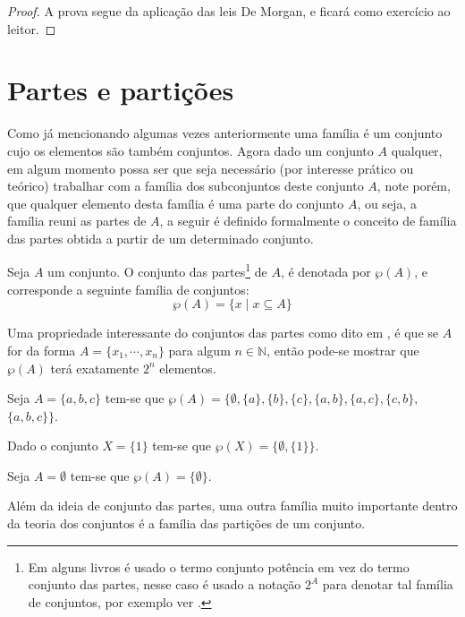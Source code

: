 \begin{proof}
	A prova segue da aplicação das leis De Morgan, e ficará como exercício ao leitor.
\end{proof}

\section{Partes e partições}

Como já mencionando algumas vezes anteriormente uma família é um conjunto cujo os elementos são também conjuntos. Agora dado um conjunto $A$ qualquer, em algum momento possa ser que seja necessário (por interesse prático ou teórico) trabalhar com a família dos subconjuntos deste conjunto $A$, note porém, que qualquer elemento desta família é uma parte do conjunto $A$, ou seja, a família reuni as partes de $A$, a seguir é definido formalmente o conceito de família das partes obtida a partir de um determinado conjunto.

\begin{definition}\label{def:ConjuntoDasPartes}
	Seja $A$ um conjunto. O conjunto das partes\footnote{Em alguns livros é usado o termo conjunto potência em vez do termo conjunto das partes, nesse caso é usado a notação $2^A$ para denotar tal família de conjuntos, por exemplo ver \cite{lipschutz2013-MD}.} de $A$, é denotada por $\wp(A)$, e corresponde a seguinte família de conjuntos:
	$$\wp(A) = \{x \mid x \subseteq A\}$$
\end{definition}


Uma propriedade interessante do conjuntos das partes como dito em \cite{lipschutz1978-TC}, é que se $A$ for da forma $A = \{x_1, \cdots, x_n\}$ para algum $n \in \mathbb{N}$, então pode-se mostrar que $\wp(A)$ terá exatamente $2^n$ elementos.

\begin{exem}
	Seja $A = \{a, b, c\}$ tem-se que $\wp(A) = \{\emptyset, \{a\}, \{b\}, \{c\}, \{a, b\},\{a, c\}, \{c, b\},$ $\{a, b, c\}\}$.
\end{exem}

\begin{exem}
	Dado o conjunto $X = \{1\}$ tem-se que $\wp(X) = \{\emptyset, \{1\}\}$.
\end{exem}

\begin{exem}
	Seja $A = \emptyset$ tem-se que $\wp(A) = \{\emptyset\}$.
\end{exem}

Além da ideia de conjunto das partes, uma outra família muito importante dentro da teoria dos conjuntos é a família das partições de um conjunto.

